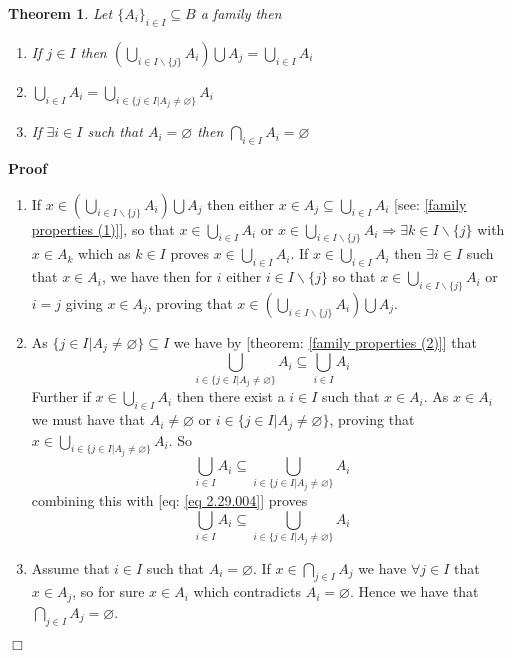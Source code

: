 \documentclass{book}
\newenvironment{proof}{\noindent\textbf{Proof\ }}{\hspace*{\fill}$\Box$\medskip}
\newtheorem{theorem}{Theorem}
\begin{document}
\begin{theorem}
  \label{family union intersection and empty set}Let $\{ A_i \}_{i \in I}
  \subseteq B$ a family then
  \begin{enumerate}
    \item If $j \in I$ then $\left( \bigcup_{i \in I\backslash \{ j \}} A_i
    \right) \bigcup A_j = \bigcup_{i \in I} A_i$
    
    \item $\bigcup_{i \in I} A_i = \bigcup_{i \in \{ j \in I|A_j \neq
    \varnothing \}} A_i$
    
    \item If $\exists i \in I$ such that $A_i = \varnothing$ then $\bigcap_{i
    \in I} A_i = \varnothing$
  \end{enumerate}
\end{theorem}

\begin{proof}
  
  \begin{enumerate}
    \item  If $x \in \left( \bigcup_{i \in I\backslash \{ j \}} A_i \right)
    \bigcup A_j$ then either $x \in A_j \subseteq \bigcup_{i \in I} A_i$ [see:
    \ref{family properties (1)}], so that $x \in \bigcup_{i \in I} A_i$ or $x
    \in \bigcup_{i \in I\backslash \{ j \}} A_i \Rightarrow \exists k \in
    I\backslash \{ j \}$ with $x \in A_k$ which as $k \in I$ proves $x \in
    \bigcup_{i \in I} A_i$. If $x \in \bigcup_{i \in I} A_i$ then $\exists i
    \in I$ such that $x \in A_i$, we have then for $i$ either $i \in
    I\backslash \{ j \}$ so that $x \in \bigcup_{i \in I\backslash \{ j \}}
    A_i$ or $i = j$ giving $x \in A_j$, proving that $x \in \left( \bigcup_{i
    \in I\backslash \{ j \}} A_i \right) \bigcup A_j .$
    
    \item As $\{ j \in I|A_j \neq \varnothing \} \subseteq I$ we have by
    [theorem: \ref{family properties (2)}] that
    \begin{equation}
      \label{eq 2.29.004} \bigcup_{i \in \{ j \in I|A_j \neq \varnothing \}}
      A_i \subseteq \bigcup_{i \in I} A_i
    \end{equation}
    Further if $x \in \bigcup_{i \in I} A_i$ then there exist a $i \in I$ such
    that $x \in A_i$. As $x \in A_i$ we must have that $A_i \neq \varnothing$
    or $i \in \{ j \in I|A_j \neq \varnothing \}$, proving that $x \in
    \bigcup_{i \in \{ j \in I|A_j \neq \varnothing \}} A_i$. So
    \[ \bigcup_{i \in I} A_i \subseteq \bigcup_{i \in \{ j \in I|A_j \neq
       \varnothing \}} A_i \]
    combining this with [eq: \ref{eq 2.29.004}] proves
    \[ \bigcup_{i \in I} A_i \subseteq \bigcup_{i \in \{ j \in I|A_j \neq
       \varnothing \}} A_i \]
    \item Assume that $i \in I$ such that $A_i = \varnothing$. If $x \in
    \bigcap_{j \in I} A_j$ we have $\forall j \in I$ that $x \in A_j$, so for
    sure $x \in A_i$ which contradicts $A_i = \varnothing$. Hence we have that
    $\bigcap_{j \in I} A_j = \varnothing$.
  \end{enumerate}
  
\end{proof}
\end{document}
